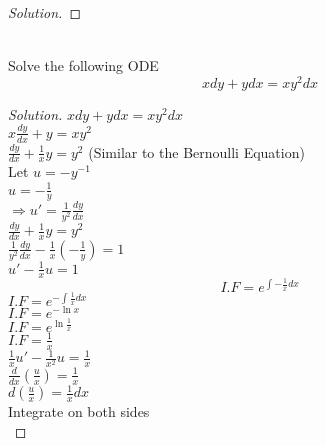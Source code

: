 \documentclass[12pt]{article}
\newenvironment{problem}[2][Problem]{\begin{trivlist}
\item[\hskip \labelsep {\bfseries #1}\hskip \labelsep {\bfseries #2.}]}{\end{trivlist}}
\begin{document}
\begin{proof}[Solution]

\end{proof}

\begin{problem}{3}
\text{ }\\
Solve the following ODE\\
$$xdy+ydx = xy^2dx$$
\end{problem}
 
\begin{proof}[Solution]

$ xdy + ydx  =  xy^2dx$ \\

$ x\frac{dy}{dx} + y = xy^2 $ \\

$\frac{dy}{dx} +\frac{1}{x} y = y^2 $     (Similar to the Bernoulli Equation)\\

Let  $u = - y^{-1} $ \\

$ u =  -\frac{1}{y} $ \\

$\Rightarrow  u'  = \frac{1}{y^2} \frac{dy}{dx}$ \\

$\frac{dy}{dx} +\frac{1}{x} y = y^2 $ \\

$ \frac{1}{y^2} \frac{dy}{dx} - \frac{1}{x} (-\frac{1}{y}) = 1$ \\

$u' - \frac{1}{x} u = 1 $ \\
$$I.F  =  e^{\int -\frac{1}{x} dx} $$ 
$I.F = e^{-\int \frac{1}{x} dx}$ \\

$I.F = e^{-\ln{x}}$ \\

$I.F = e^{\ln{\frac{1}{x}}}$ \\

$I.F = \frac{1}{x} $ \\

$\frac{1}{x} u' - \frac{1}{x^2} u = \frac{1}{x} $ \\

$\frac{d}{dx} (\frac{u}{x}) = \frac{1}{x}  $ \\

$d(\frac{u}{x}) = \frac{1}{x} dx $ \\

Integrate on both sides \\


\end{proof}
\end{document}
